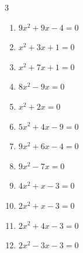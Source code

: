 \begin{multicols}{3}
\begin{enumerate}

  \item $9x^{2}+9x-4=0$


\columnbreak %

  \item $x^{2}+3x+1=0$


  \item $x^{2}+7x+1=0$


  \item $8x^{2}-9x=0$


  \item $x^{2}+2x=0$

        \phantom{$\displaystyle x=0, \; -2$}

  \item $5x^{2}+4x-9=0$


  \item $9x^{2}+6x-4=0$


  \item $9x^{2}-7x=0$


\columnbreak %

\resetques

  \item $4x^{2}+x-3=0$


  \item $2x^{2}+x-3=0$


  \item $2x^{2}+4x-3=0$


  \item $2x^{2}-3x-3=0$


\end{enumerate}
\end{multicols}
